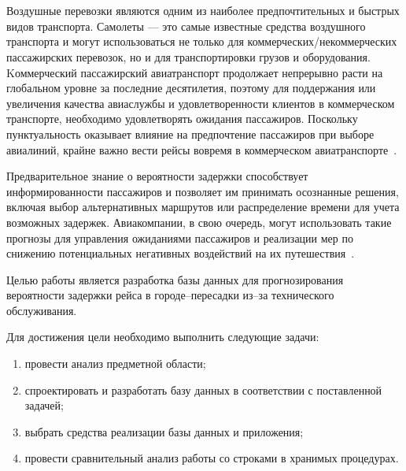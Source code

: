 \newpage
{}
\chapter*{}

Воздушные перевозки являются одним из наиболее предпочтительных и быстрых видов транспорта.
Самолеты --- это самые известные средства воздушного транспорта и могут использоваться не только для коммерческих/некоммерческих пассажирских перевозок, но и для транспортировки грузов и оборудования.
Kоммерческий пассажирский авиатранспорт продолжает непрерывно расти на глобальном уровне за последние десятилетия, поэтому для поддержания или увеличения качества авиаслужбы и удовлетворенности клиентов в коммерческом транспорте, необходимо удовлетворять ожидания пассажиров.
Поскольку пунктуальность оказывает влияние на предпочтение пассажиров при выборе авиалиний, крайне важно вести рейсы вовремя в коммерческом авиатранспорте~\cite{tat}.

Предварительное знание о вероятности задержки способствует информированности пассажиров и позволяет им принимать осознанные решения, включая выбор альтернативных маршрутов или распределение времени для учета возможных задержек.
Авиакомпании, в свою очередь, могут использовать такие прогнозы для управления ожиданиями пассажиров и реализации мер по снижению потенциальных негативных воздействий на их путешествия~\cite{trt}.

Целью работы является разработка базы данных для прогнозирования вероятности задержки рейса в городе--пересадки из--за технического обслуживания.

Для достижения цели необходимо выполнить следующие задачи:
\begin{enumerate}[label=\arabic*)]
    \item провести анализ предметной области;
    \item спроектировать и разработать базу данных в соответствии с поставленной задачей;
    \item выбрать средства реализации базы данных и приложения;
    \item провести сравнительный анализ работы со строками в хранимых процедурах.
\end{enumerate}